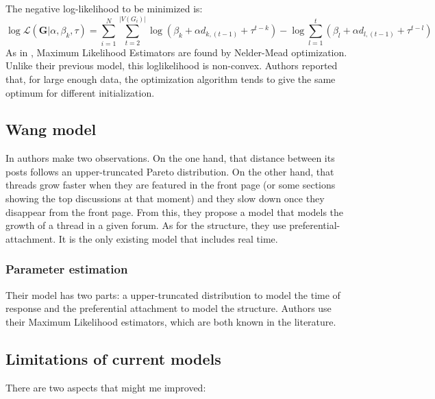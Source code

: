 \documentclass[smallextended]{svjour3}          %
\begin{document}
The negative log-likelihood to be minimized is: 
\begin{equation}
\log \mathcal{L}(\mathbf{G} | \alpha, \beta_k, \tau)
=
\sum_{i=1}^{N}
\sum_{t=2}^{|V(G_i)|}
\log
\left(
\beta_k+
\alpha d_{k,(t-1)}
+ \tau^{t-k}
\right)
- \log
\sum_{l=1}^{t}
\left(\beta_l+
\alpha d_{l, (t-1)}
+ \tau^{t-l}
\right)
\end{equation}
As in \cite{Gomez2010}, Maximum Likelihood Estimators are found by Nelder-Mead optimization. Unlike their previous model, this loglikelihood is non-convex. Authors reported that, for large enough data, the optimization algorithm tends to give the same optimum for different initialization.



\subsection{Wang model}

In \cite{Wang2012e} authors make two observations. On the one hand, that distance between its posts follows an upper-truncated Pareto distribution. On the other hand, that threads grow faster when they are featured in the front page (or some sections showing the top discussions at that moment) and they slow down once they disappear from the front page. From this, they propose a model that models the growth of a thread in a given forum. As for the structure, they use preferential-attachment. It is the only existing model that includes real time.

\subsubsection*{Parameter estimation}
Their model has two parts: a upper-truncated distribution to model the time of response and the preferential attachment to model the structure.
Authors use their Maximum Likelihood estimators, which are both known in the literature.

\subsection{Limitations of current models}
There are two aspects that might me improved:
\end{document}
